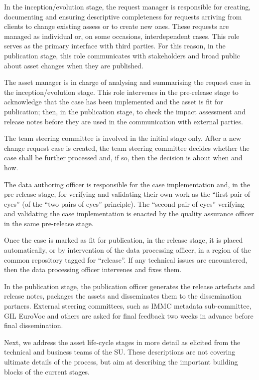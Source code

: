 	In the inception/evolution stage, the request manager is responsible for creating, documenting and ensuring descriptive completeness for requests arriving from clients to change existing assess or to create new ones. These requests are managed as individual or, on some occasions, interdependent cases. This role serves as the primary interface with third parties. For this reason, in the publication stage, this role communicates with stakeholders and broad public about asset changes when they are published.
	
	The asset manager is in charge of analysing and summarising the request case in the inception/evolution stage. This role intervenes in the pre-release stage to acknowledge that the case has been implemented and the asset is fit for publication; then, in the publication stage, to check the impact assessment and release notes before they are used in the communication with external parties.
	
	The team steering committee is involved in the initial stage only. After a new change request case is created, the team steering committee decides whether the case shall be further processed and, if so, then the decision is about when and how.
	
	The data authoring officer is responsible for the case implementation and, in the pre-release stage, for verifying and validating their own work as the ``first pair of eyes'' (of the ``two pairs of eyes'' principle). The ``second pair of eyes'' verifying and validating the case implementation is enacted by the quality assurance officer in the same pre-release stage.
	
	Once the case is marked as fit for publication, in the release stage, it is placed automatically, or by intervention of the data processing officer, in a region of the common repository tagged for ``release''. If any technical issues are encountered, then the data processing officer intervenes and fixes them.
	
	In the publication stage, the publication officer generates the release artefacts and release notes, packages the assets and disseminates them to the dissemination partners. External steering committees, such as IMMC metadata sub-committee, GIL EuroVoc and others are asked for final feedback two weeks in advance before final dissemination.
	
	Next, we address the asset life-cycle stages in more detail as elicited from the technical and business teams of the SU. These descriptions are not covering ultimate details of the process, but aim at describing the important building blocks of the current stages. 
	
